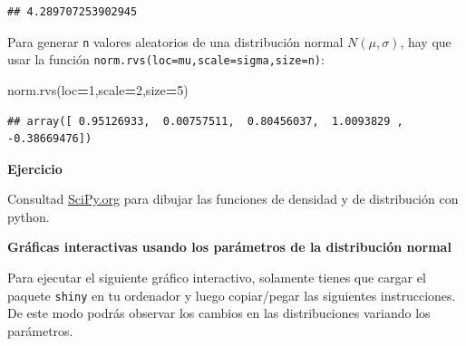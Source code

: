 \documentclass[]{book}
\newenvironment{Shaded}{\begin{snugshade}}{\end{snugshade}}
\newcommand{\DecValTok}[1]{\textcolor[rgb]{0.00,0.00,0.81}{#1}}
\newcommand{\NormalTok}[1]{#1}
\newcommand{\OperatorTok}[1]{\textcolor[rgb]{0.81,0.36,0.00}{\textbf{#1}}}
\begin{document}
\begin{verbatim}
## 4.289707253902945
\end{verbatim}

Para generar \texttt{n} valores aleatorios de una distribución normal \(N(\mu,\sigma)\), hay que usar la función \texttt{norm.rvs(loc=mu,scale=sigma,size=n)}:

\begin{Shaded}
\begin{Highlighting}[]
\NormalTok{norm.rvs(loc}\OperatorTok{=}\DecValTok{1}\NormalTok{,scale}\OperatorTok{=}\DecValTok{2}\NormalTok{,size}\OperatorTok{=}\DecValTok{5}\NormalTok{)}
\end{Highlighting}
\end{Shaded}

\begin{verbatim}
## array([ 0.95126933,  0.00757511,  0.80456037,  1.0093829 , -0.38669476])
\end{verbatim}

\textbf{Ejercicio}

Consultad \href{https://docs.scipy.org/doc/scipy/reference/generated/scipy.stats.norm.html}{SciPy.org} para dibujar las funciones de densidad y de distribución con python.

\textbf{Gráficas interactivas usando los parámetros de la distribución normal}

Para ejecutar el siguiente gráfico interactivo, solamente tienes que cargar el paquete \texttt{shiny} en tu ordenador y luego copiar/pegar las siguientes instrucciones. De este modo podrás observar los cambios en las distribuciones variando los parámetros.
\end{document}
